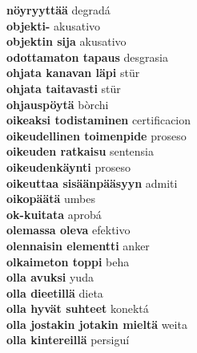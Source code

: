 \textbf{ nöyryyttää  } degradá \\
\textbf{ objekti-  } akusativo \\
\textbf{ objektin sija  } akusativo \\
\textbf{ odottamaton tapaus  } desgrasia \\
\textbf{ ohjata kanavan läpi  } stür \\
\textbf{ ohjata taitavasti  } stür \\
\textbf{ ohjauspöytä  } bòrchi \\
\textbf{ oikeaksi todistaminen  } certificacion \\
\textbf{ oikeudellinen toimenpide  } proseso \\
\textbf{ oikeuden ratkaisu  } sentensia \\
\textbf{ oikeudenkäynti  } proseso \\
\textbf{ oikeuttaa sisäänpääsyyn  } admiti \\
\textbf{ oikopäätä  } umbes \\
\textbf{ ok-kuitata  } aprobá \\
\textbf{ olemassa oleva  } efektivo \\
\textbf{ olennaisin elementti  } anker \\
\textbf{ olkaimeton toppi  } beha \\
\textbf{ olla avuksi  } yuda \\
\textbf{ olla dieetillä  } dieta \\
\textbf{ olla hyvät suhteet  } konektá \\
\textbf{ olla jostakin jotakin mieltä  } weita \\
\textbf{ olla kintereillä  } persiguí \\
